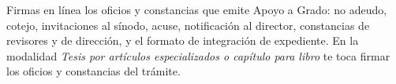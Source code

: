 \documentclass[11pt,a4paper]{article}
\begin{document}
{\small\tableofcontents}
\newpage
\begin{quevasahacer}
Firmas en línea los oficios y constancias que emite Apoyo a Grado: no adeudo, cotejo, invitaciones al sínodo, acuse, notificación al director, constancias de revisores y de dirección, y el formato de integración de expediente. En la modalidad \emph{Tesis por artículos especializados o capítulo para libro} te toca firmar los oficios y constancias del trámite.
\end{quevasahacer}




\end{document}
